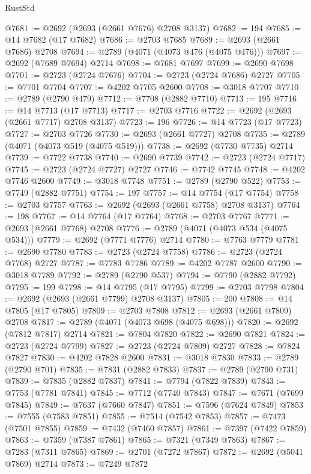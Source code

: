 \begin{lexlean}{RustStd}
\begin{coremodule}
@7681 := @2692 (@2693 (@2661 @7676) @2708 @3137)
@7682 := 194
@7685 := @14 @7682 (@17 @7682)
@7686 := @2703 @7685
@7689 := @2693 (@2661 @7686) @2708
@7694 := @2789 (@4071 (@4073 @476 (@4075 @476)))
@7697 := @2692 (@7689 @7694) @2714
@7698 := @7681 @7697
@7699 := @2690 @7698
@7701 := @2723 (@2724 @7676)
@7704 := @2723 (@2724 @7686) @2727
@7705 := @7701 @7704
@7707 := @4202 @7705 @2600
@7708 := @3018 @7707
@7710 := @2789 (@2790 @479)
@7712 := @7708 (@2882 @7710)
@7713 := 195
@7716 := @14 @7713 (@17 @7713)
@7717 := @2703 @7716
@7722 := @2692 (@2693 (@2661 @7717) @2708 @3137)
@7723 := 196
@7726 := @14 @7723 (@17 @7723)
@7727 := @2703 @7726
@7730 := @2693 (@2661 @7727) @2708
@7735 := @2789 (@4071 (@4073 @519 (@4075 @519)))
@7738 := @2692 (@7730 @7735) @2714
@7739 := @7722 @7738
@7740 := @2690 @7739
@7742 := @2723 (@2724 @7717)
@7745 := @2723 (@2724 @7727) @2727
@7746 := @7742 @7745
@7748 := @4202 @7746 @2600
@7749 := @3018 @7748
@7751 := @2789 (@2790 @522)
@7753 := @7749 (@2882 @7751)
@7754 := 197
@7757 := @14 @7754 (@17 @7754)
@7758 := @2703 @7757
@7763 := @2692 (@2693 (@2661 @7758) @2708 @3137)
@7764 := 198
@7767 := @14 @7764 (@17 @7764)
@7768 := @2703 @7767
@7771 := @2693 (@2661 @7768) @2708
@7776 := @2789 (@4071 (@4073 @534 (@4075 @534)))
@7779 := @2692 (@7771 @7776) @2714
@7780 := @7763 @7779
@7781 := @2690 @7780
@7783 := @2723 (@2724 @7758)
@7786 := @2723 (@2724 @7768) @2727
@7787 := @7783 @7786
@7789 := @4202 @7787 @2600
@7790 := @3018 @7789
@7792 := @2789 (@2790 @537)
@7794 := @7790 (@2882 @7792)
@7795 := 199
@7798 := @14 @7795 (@17 @7795)
@7799 := @2703 @7798
@7804 := @2692 (@2693 (@2661 @7799) @2708 @3137)
@7805 := 200
@7808 := @14 @7805 (@17 @7805)
@7809 := @2703 @7808
@7812 := @2693 (@2661 @7809) @2708
@7817 := @2789 (@4071 (@4073 @698 (@4075 @698)))
@7820 := @2692 (@7812 @7817) @2714
@7821 := @7804 @7820
@7822 := @2690 @7821
@7824 := @2723 (@2724 @7799)
@7827 := @2723 (@2724 @7809) @2727
@7828 := @7824 @7827
@7830 := @4202 @7828 @2600
@7831 := @3018 @7830
@7833 := @2789 (@2790 @701)
@7835 := @7831 (@2882 @7833)
@7837 := @2789 (@2790 @731)
@7839 := @7835 (@2882 @7837)
@7841 := @7794 (@7822 @7839)
@7843 := @7753 (@7781 @7841)
@7845 := @7712 (@7740 @7843)
@7847 := @7671 (@7699 @7845)
@7849 := @7637 (@7660 @7847)
@7851 := @7596 (@7624 @7849)
@7853 := @7555 (@7583 @7851)
@7855 := @7514 (@7542 @7853)
@7857 := @7473 (@7501 @7855)
@7859 := @7432 (@7460 @7857)
@7861 := @7397 (@7422 @7859)
@7863 := @7359 (@7387 @7861)
@7865 := @7321 (@7349 @7863)
@7867 := @7283 (@7311 @7865)
@7869 := @2701 (@7272 @7867)
@7872 := @2692 (@5041 @7869) @2714
@7873 := @7249 @7872

\end{coremodule}
\end{lexlean}
